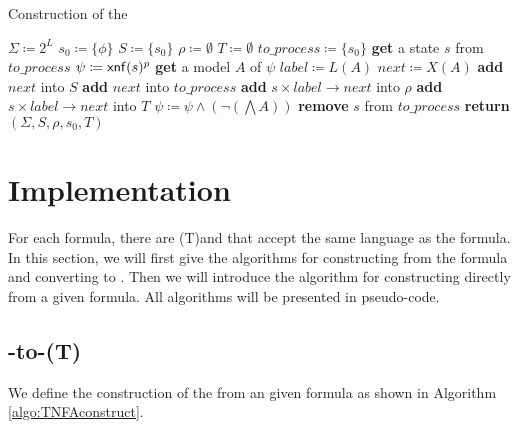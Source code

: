 \begin{algorithm}[H] \label{algo:TNFAconstruct}
  \caption{Construction of the \TNFA}
  \LinesNumbered
  $\Sigma\coloneqq 2^L$\;
  $s_0\coloneqq\{\phi\}$\;
  $S\coloneqq\{s_0\}$\;
  $\rho\coloneqq\emptyset$\;
  $T\coloneqq\emptyset$\;
  $to\_process\coloneqq\{s_0\}$\;
  {
    \textbf{get} a state $s$ from $to\_process$\;
    $\psi\coloneqq{\sf xnf}(s)^p$\;
    {
      \textbf{get} a model $A$ of $\psi$\;
      $label\coloneqq L(A)$\;
      $next\coloneqq X(A)$\;
      {
        \textbf{add} $next$ into $S$\;
        \textbf{add} $next$ into $to\_process$\;
      }
       \textbf{add} $s\times label\to next$ into $\rho$\;
      {
        \textbf{add} $s\times label\to next$ into $T$\;
      }
       $\psi\coloneqq \psi\land(\neg(\bigwedge A))$\;
    }
    \textbf{remove} $s$ from $to\_process$\;
  }
  \textbf{return} $(\Sigma,S,\rho,s_0,T)$\;
\end{algorithm}

\section{Implementation}\label{sec:algorithm}
For each \ltlf formula, there are (T)\NFA and \DFA that accept the same language as the formula. In this section, we will first give the algorithms for constructing \TNFA from the \ltlf formula and converting \TNFA to \NFA. Then we will introduce the algorithm for constructing \TDFA directly from a given \ltlf formula. All algorithms will be presented in pseudo-code.

\subsection{\ltlf-to-(T)\NFA}
We define the construction of the \TNFA from an given \ltlf formula as shown in Algorithm \ref{algo:TNFAconstruct}. 


